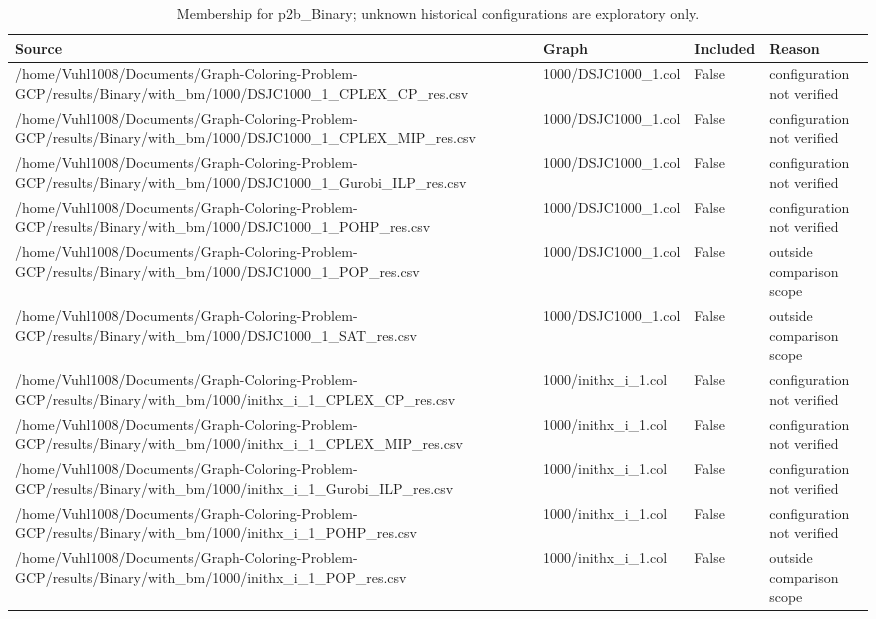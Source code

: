 \begin{table}[htbp]
\centering
\caption{Membership for p2b\_Binary; unknown historical configurations are exploratory only.}
\label{tab:p2b-Binary-membership}
\begin{tabular}{llll}
\hline
Source & Graph & Included & Reason \\
\hline
/home/Vuhl1008/Documents/Graph-Coloring-Problem-GCP/results/Binary/with\_bm/1000/DSJC1000\_1\_CPLEX\_CP\_res.csv & 1000/DSJC1000\_1.col & False & configuration not verified \\
/home/Vuhl1008/Documents/Graph-Coloring-Problem-GCP/results/Binary/with\_bm/1000/DSJC1000\_1\_CPLEX\_MIP\_res.csv & 1000/DSJC1000\_1.col & False & configuration not verified \\
/home/Vuhl1008/Documents/Graph-Coloring-Problem-GCP/results/Binary/with\_bm/1000/DSJC1000\_1\_Gurobi\_ILP\_res.csv & 1000/DSJC1000\_1.col & False & configuration not verified \\
/home/Vuhl1008/Documents/Graph-Coloring-Problem-GCP/results/Binary/with\_bm/1000/DSJC1000\_1\_POHP\_res.csv & 1000/DSJC1000\_1.col & False & configuration not verified \\
/home/Vuhl1008/Documents/Graph-Coloring-Problem-GCP/results/Binary/with\_bm/1000/DSJC1000\_1\_POP\_res.csv & 1000/DSJC1000\_1.col & False & outside comparison scope \\
/home/Vuhl1008/Documents/Graph-Coloring-Problem-GCP/results/Binary/with\_bm/1000/DSJC1000\_1\_SAT\_res.csv & 1000/DSJC1000\_1.col & False & outside comparison scope \\
/home/Vuhl1008/Documents/Graph-Coloring-Problem-GCP/results/Binary/with\_bm/1000/inithx\_i\_1\_CPLEX\_CP\_res.csv & 1000/inithx\_i\_1.col & False & configuration not verified \\
/home/Vuhl1008/Documents/Graph-Coloring-Problem-GCP/results/Binary/with\_bm/1000/inithx\_i\_1\_CPLEX\_MIP\_res.csv & 1000/inithx\_i\_1.col & False & configuration not verified \\
/home/Vuhl1008/Documents/Graph-Coloring-Problem-GCP/results/Binary/with\_bm/1000/inithx\_i\_1\_Gurobi\_ILP\_res.csv & 1000/inithx\_i\_1.col & False & configuration not verified \\
/home/Vuhl1008/Documents/Graph-Coloring-Problem-GCP/results/Binary/with\_bm/1000/inithx\_i\_1\_POHP\_res.csv & 1000/inithx\_i\_1.col & False & configuration not verified \\
/home/Vuhl1008/Documents/Graph-Coloring-Problem-GCP/results/Binary/with\_bm/1000/inithx\_i\_1\_POP\_res.csv & 1000/inithx\_i\_1.col & False & outside comparison scope \\

\end{tabular}
\end{table}

